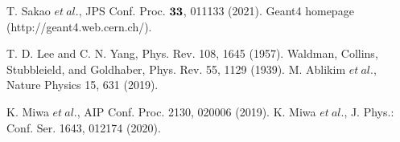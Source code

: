 \begin{thebibliography}{99}
 T. Sakao $et\ al.$, JPS Conf. Proc. $\bf{33}$, 011133 (2021).
Geant4 homepage (http://geant4.web.cern.ch/).



T. D. Lee and C. N. Yang, Phys. Rev. 108, 1645 (1957).
Waldman, Collins, Stubbleield, and Goldhaber, Phys. Rev. 55, 1129 (1939).
M. Ablikim $et\ al.$, Nature Physics 15, 631 (2019).

K. Miwa $et\ al.$, AIP Conf. Proc. 2130, 020006 (2019).
K. Miwa $et\ al.$, J. Phys.: Conf. Ser. 1643, 012174 (2020).


\begin{comment}


\bibitem{Oka-2000}M. Oka $et\ al.$, Prog. Theor. Phys. Sup. 137 (2000) 1.
\bibitem{Morimatsu-1984}O. Morimatsu, S. Ohta, K. Shimizu and K. Yazaki, Nucl. Phys. A420 (1984), 573.
\bibitem{Tani-1996}Y. Tani and M. Oka, Soryushiron-Kenkyu (Kyoto) 94 (1996), B39.






\bibitem{chiEFT-2005}J. Haidenbauer, U.-G. Mei$\ss$ner, Phys. Rev. C 72, 044005 (2005).

\bibitem{QCD-Nemura2019}H. Nemura et al., AIP Conf. Proc. 2130, 040005 (2019).




\bibitem{Lp-LOI}R. Honda $et\ al.$, Letter of Intent for an experiment at 50-GeV PS (2020)
\bibitem{Lp-1959}F.S. Crawford, Jr., M. Cresti, M.L. Good, F.T. Solmitz, M.L. Stevenson, and H.K. Ticho, Phys. Rev. Lett. 2, 174 (1959).
\bibitem{Lp-1961}G. Alexander, J.A. Anderson, F.S. Crawford, Jr., W. Laskar, and L.J. Lloyd, Phys. Rev. Lett. 7, 348 (1961).
\bibitem{Lp-1963}Thomas H. Groves, Phys. Rev. 129, 1372 (1963).
\bibitem{Lp-1964}B. Sechi-Zorn, R. A. Burnstein, T. B. Day, B. Kehoe, and G.A. Snow, Phys. Rev. Lett. 13, 282 (1964).


\bibitem{h3l}
\bibitem{he5l}

\bibitem{Aka-2020}Y. Akazawa $et\ al.$, Nucl. Inst. Meth. A1029, 166430, (2022).
\bibitem{KEK1}J.K. Ahn $et\ al.$, Nucl. Phys. A 648, 263 (1999).
\bibitem{KEK2}Y. Kondo et al., Nucl. Phys. A 676, 371 (2000).
\bibitem{KEK3}J.K. Ahn $et\ al.$, Nucl. Phys. A 761, 41 (2005).



\end{comment}
\end{thebibliography}
